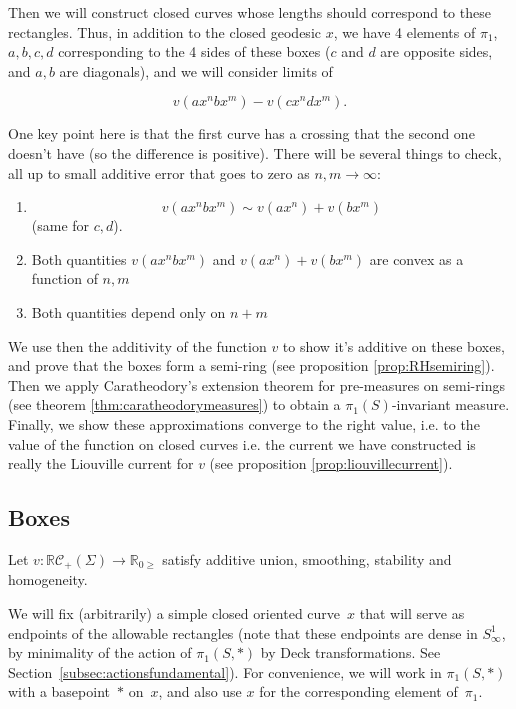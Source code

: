 Then we will construct closed curves whose lengths
should correspond to these rectangles. Thus, in addition to the closed geodesic
$x$, we have 4 elements of $\pi_1$, $a,b,c,d$ corresponding to the 4 sides of
these boxes ($c$ and $d$ are opposite sides, and $a,b$ are diagonals), and we will consider limits of

  $$v(a x^n b x^m) - v(c x^n d x^m).$$

One key point here is that the first curve has a crossing that the second one doesn't have
(so the difference is positive). There will be several things to check, all
up to small additive error that goes to zero as $n,m \to \infty$:

\begin{enumerate}
\item $$v(a x^n b x^m) \sim  v(a x^n) + v(b x^m)$$ (same for $c,d$).

\item Both quantities $v(a x^n b x^m)$ and $v(a x^n) + v(b x^m)$ are convex as a function of $n,m$

\item Both quantities depend only on $n+m$
\end{enumerate}


 We use then the additivity of the function $v$ to show it's additive on these boxes, and prove that the boxes form a semi-ring (see proposition \ref{prop:RHsemiring}).
 Then we apply Caratheodory's extension theorem for pre-measures on semi-rings (see theorem \ref{thm:caratheodorymeasures}) to obtain a $\pi_1(S)$-invariant measure.
 Finally, we show these approximations converge to the right value, i.e. to the value of the function on closed curves i.e. the current we have
constructed is really the Liouville current for $v$ (see proposition \ref{prop:liouvillecurrent}).

\subsection{Boxes}
\label{sec:boxes}

Let $v\colon \mathbb{R}\mathcal{C}_+(\Sigma) \to \mathbb{R}_{0 \geq}$ satisfy additive union, smoothing, stability and homogeneity.

We will fix (arbitrarily) a simple closed oriented curve~$x$ that will
serve as endpoints of the allowable rectangles (note that these endpoints are dense in $S^1_{\infty}$, by minimality of the action of $\pi_1(S,*)$ by Deck transformations. See Section~\ref{subsec:actionsfundamental}). For convenience, we will work in $\pi_1(S,\ast)$ with a basepoint~$\ast$ on~$x$, and also
use $x$ for the corresponding element of~$\pi_1$.

